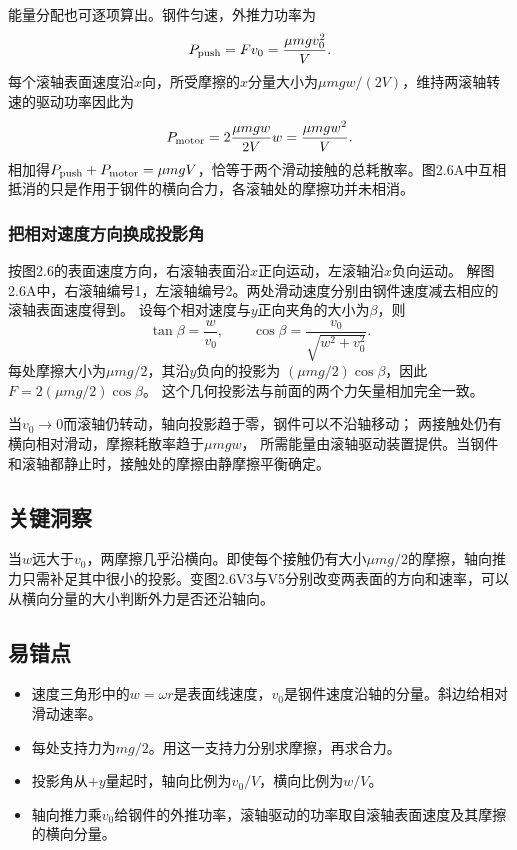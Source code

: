 \documentclass[UTF8,fontset=fandol,a4paper,11pt]{ctexart}
\begin{document}
能量分配也可逐项算出。钢件匀速，外推力功率为
\[P_{\rm push}=Fv_0=\frac{\mu mgv_0^2}{V}.\]
每个滚轴表面速度沿$x$向，所受摩擦的$x$分量大小为$\mu mgw/(2V)$，维持两滚轴转速的驱动功率因此为
\[P_{\rm motor}=2\frac{\mu mgw}{2V}w=\frac{\mu mgw^2}{V}.\]
相加得$P_{\rm push}+P_{\rm motor}=\mu mgV$，恰等于两个滑动接触的总耗散率。图2.6A中互相抵消的只是作用于钢件的横向合力，各滚轴处的摩擦功并未相消。

\subsubsection*{把相对速度方向换成投影角}
按图2.6的表面速度方向，右滚轴表面沿$x$正向运动，左滚轴沿$x$负向运动。
解图2.6A中，右滚轴编号1，左滚轴编号2。两处滑动速度分别由钢件速度减去相应的滚轴表面速度得到。
设每个相对速度与$y$正向夹角的大小为$\beta$，则
\[
\tan\beta=\frac{w}{v_0},\qquad
\cos\beta=\frac{v_0}{\sqrt{w^2+v_0^2}}.
\]
每处摩擦大小为$\mu mg/2$，其沿$y$负向的投影为
$(\mu mg/2)\cos\beta$，因此$F=2(\mu mg/2)\cos\beta$。
这个几何投影法与前面的两个力矢量相加完全一致。

当$v_0\to0$而滚轴仍转动，轴向投影趋于零，钢件可以不沿轴移动；
两接触处仍有横向相对滑动，摩擦耗散率趋于$\mu mgw$，
所需能量由滚轴驱动装置提供。当钢件和滚轴都静止时，接触处的摩擦由静摩擦平衡确定。




\subsection*{关键洞察}

当$w$远大于$v_0$，两摩擦几乎沿横向。即使每个接触仍有大小$\mu mg/2$的摩擦，轴向推力只需补足其中很小的投影。变图2.6V3与V5分别改变两表面的方向和速率，可以从横向分量的大小判断外力是否还沿轴向。



\subsection*{易错点}

\begin{itemize}
\item 速度三角形中的$w=\omega r$是表面线速度，$v_0$是钢件速度沿轴的分量。斜边给相对滑动速率。
\item 每处支持力为$mg/2$。用这一支持力分别求摩擦，再求合力。
\item 投影角从$+y$量起时，轴向比例为$v_0/V$，横向比例为$w/V$。
\item 轴向推力乘$v_0$给钢件的外推功率，滚轴驱动的功率取自滚轴表面速度及其摩擦的横向分量。
\end{itemize}
\end{document}
